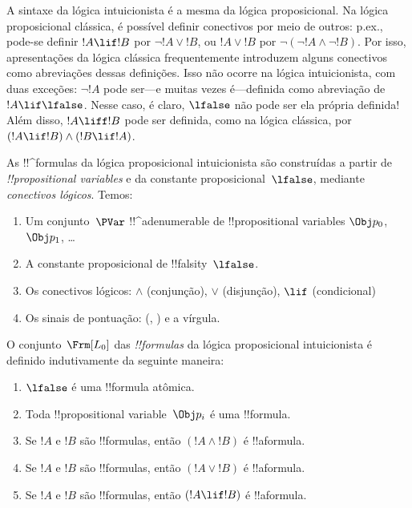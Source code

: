 \documentclass[../../../include/open-logic-section]{subfiles}
\begin{document}


A sintaxe da lógica intuicionista é a mesma da lógica proposicional.
Na lógica proposicional clássica, é possível definir conectivos por
meio de outros: p.ex., pode-se definir $!A \lif !B$ por
$\lnot !A \lor !B$, ou $!A \lor !B$ por $\lnot(\lnot !A \land \lnot
!B)$. Por isso, apresentações da lógica clássica frequentemente
introduzem alguns conectivos como abreviações dessas definições. Isso
não ocorre na lógica intuicionista, com duas exceções: $\lnot !A$ pode
ser---e muitas vezes é---definida como abreviação de $!A \lif \lfalse$.
Nesse caso, é claro, $\lfalse$ não pode ser ela própria definida!{}
Além disso, $!A \liff !B$ pode ser definida, como na lógica clássica,
por $(!A \lif !B) \land (!B \lif !A)$.

As !!^{formula}s da lógica proposicional intuicionista são construídas
a partir de \emph{!!{propositional variable}s} e da constante
proposicional~$\lfalse$, mediante \emph{conectivos lógicos}. Temos:

\begin{enumerate}
\item Um conjunto~$\PVar$ !!^a{denumerable} de !!{propositional variable}s $\Obj p_0$,
  $\Obj p_1$, \dots
  \item A constante proposicional de !!{falsity}~$\lfalse$.
\item Os conectivos lógicos: $\land$
  (conjunção), $\lor$ (disjunção), $\lif$ (condicional)
\item Os sinais de pontuação: (, ) e a vírgula.
\end{enumerate}

\begin{defn}[Fórmula]
 O conjunto~$\Frm[L_0]$ das \emph{!!{formula}s} da
lógica proposicional intuicionista é definido indutivamente da seguinte maneira:
\begin{enumerate}
\item $\lfalse$ é uma !!{formula} atômica.

\item Toda !!{propositional variable}~$\Obj p_i$ é uma
  !!{formula}.

\item Se $!A$ e $!B$ são !!{formula}s, então $(!A \land
  !B)$ é !!a{formula}.

\item Se $!A$ e $!B$ são !!{formula}s, então $(!A \lor !B)$
  é !!a{formula}.

\item Se $!A$ e $!B$ são !!{formula}s, então $(!A \lif !B)$
  é !!a{formula}.

\end{enumerate}
\end{defn}
\end{document}
